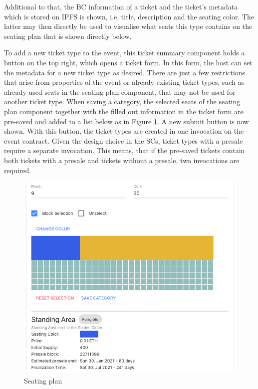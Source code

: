 Additional to that, the BC information of a ticket and the ticket's metadata which is stored on IPFS is shown, i.e. title, description and the seating color. The latter may then directly be used to visualise what seats this type contains on the seating plan that is shown directly below.

To add a new ticket type to the event, this ticket summary component holds a button on the top right, which opens a ticket form. In this form, the host can set the metadata for a new ticket type as desired. There are just a few restrictions that arise from properties of the event or already existing ticket types, such as already used seats in the seating plan component, that may not be used for another ticket type. When saving a category, the selected seats of the seating plan component together with the filled out information in the ticket form are pre-saved and added to a list below as in Figure \ref{img:host-seating-plan}. A new submit button is now shown. With this button, the ticket types are created in one invocation on the event contract. Given the design choice in the SCs, ticket types with a presale require a separate invocation. This means, that if the pre-saved tickets contain both tickets with a presale and tickets without a presale, two invocations are required.

\begin{figure}[H]
    \centering
    \includegraphics[width=14cm]{images/host-seating-plan.png}
    \caption{Seating plan \protect}
    \label{img:host-seating-plan}
\end{figure}

